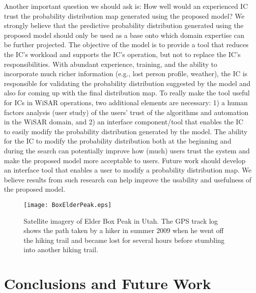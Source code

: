 \documentclass[smallextended,natbib]{svjour3}
\begin{document}
Another important question we should ask is: How well would an experienced IC trust the probability distribution map generated using the proposed model? We strongly believe that the predictive probability distribution generated using the proposed model should only be used as a base onto which domain expertise can be further projected. The objective of the model is to provide a tool that reduces the IC's workload and supports the IC's operation, but not to replace the IC's responsibilities. With abundant experience, training, and the ability to incorporate much richer information (e.g., lost person profile, weather), the IC is responsible for validating the probability distribution suggested by the model and also for coming up with the final distribution map. To really make the tool useful for ICs in WiSAR operations, two additional elements are necessary: 1) a human factors analysis (user study) of the users' trust of the algorithms and automation in the WiSAR domain, and 2) an interface component/tool that enables the IC to easily modify the probability distribution generated by the model. The ability for the IC to modify the probability distribution both at the beginning and during the search can potentially improve how (much) users trust the system and make the proposed model more acceptable to users. Future work should develop an interface tool that enables a user to modify a probability distribution map. We believe results from such research can help improve the usability and usefulness of the proposed model.

\begin{figure}
\centering
\texttt{[image: BoxElderPeak.eps]}
\caption[Satellite imagery of Elder Box Peak in Utah]{Satellite imagery of Elder Box Peak in Utah. The GPS track log shows the path taken by a hiker in summer 2009 when he went off the hiking trail and became lost for several hours before stumbling into another hiking trail.}
\label{BoxElderPeak}
\end{figure}



\section{Conclusions and Future Work}
\label{sec:6}
\end{document}
